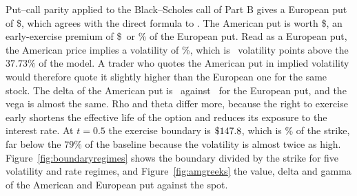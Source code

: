 Put--call parity applied to the Black--Scholes call of Part B gives a European put of \$\NvdaPutEu, which agrees with the direct formula to \ParityNvda.
The American put is worth \$\NvdaPutAm, an early-exercise premium of \$\NvdaPutEEP\ or \NvdaPutEEPpct\% of the European put.
Read as a European put, the American price implies a volatility of \NvdaPutIV\%, which is \NvdaPutIVup\ volatility points above the $37.73\%$ of the model.
A trader who quotes the American put in implied volatility would therefore quote it slightly higher than the European one for the same stock.
The delta of the American put is \NvdaPutDelta\ against \NvdaPutDeltaEu\ for the European put, and the vega is almost the same.
Rho and theta differ more, because the right to exercise early shortens the effective life of the option and reduces its exposure to the interest rate.
At $t=0.5$ the exercise boundary is $\$147.8$, which is \NvdaBhalfPct\% of the strike, far below the $79\%$ of the baseline because the volatility is almost twice as high.
Figure~\ref{fig:boundaryregimes} shows the boundary divided by the strike for five volatility and rate regimes, and Figure~\ref{fig:amgreeks} the value, delta and gamma of the American and European put against the spot.
